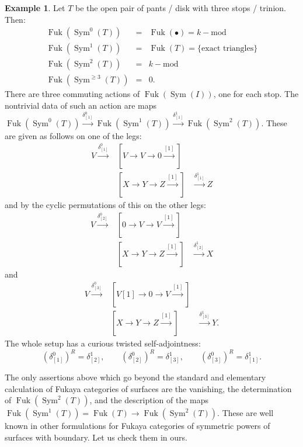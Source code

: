 \documentclass{article}
\DeclareMathOperator{\Sym}{Sym}
\DeclareMathOperator{\Fuk}{Fuk}
\theoremstyle{definition}
\newtheorem{example}[theorem]{Example}
\begin{document}
\begin{example}
    Let $T$ be the open pair of pants / disk with three stops / trinion.  Then:    
    \begin{eqnarray*}
        \Fuk(\Sym^0(T)) & = & \Fuk(\bullet) = k-\mathrm{mod} \\
        \Fuk(\Sym^1(T)) & = & \Fuk(T) = \{\mbox{exact triangles}\} \\
         \Fuk(\Sym^2(T)) & = & k-\mathrm{mod} \\
        \Fuk(\Sym^{\ge 3}(T)) & = & 0.
    \end{eqnarray*}
    There are three commuting actions of $\Fuk(\Sym(I))$, one for each stop.  The nontrivial data of such an action are  maps 
    $\Fuk(\Sym^0(T)) \xrightarrow{\delta^0_{[1]}} \Fuk(\Sym^1(T))\xrightarrow{\delta^1_{[1]}} \Fuk(\Sym^2(T))$.  These are given as follows on one of the legs: 
    \begin{eqnarray*}
        V \xrightarrow{\delta^0_{[1]}} & [V \to V \to 0 \xrightarrow{[1]}] & \\ 
        & [X \to Y \to Z \xrightarrow{[1]}] & \xrightarrow{\delta^1_{[1]}}  Z
    \end{eqnarray*}
    and by the cyclic permutations of this on the other legs:
        \begin{eqnarray*}
        V \xrightarrow{\delta^0_{[2]}} & [0 \to V \to V \xrightarrow{[1]}] & \\ 
        & [X \to Y \to Z \xrightarrow{[1]}] & \xrightarrow{\delta^1_{[2]}}  X
    \end{eqnarray*}
    and
        \begin{eqnarray*}
        V \xrightarrow{\delta^0_{[3]}} & [V[1] \to 0 \to V \xrightarrow{[1]}] & \\ 
        & [X \to Y \to Z \xrightarrow{[1]}] & \xrightarrow{\delta^1_{[3]}}  Y.
    \end{eqnarray*}
    The whole setup has a curious twisted self-adjointness:     \begin{equation}\label{werd} (\delta_{[1]}^0)^R = \delta_{[2]}^1, \qquad (\delta_{[2]}^0)^R = \delta_{[3]}^1, \qquad (\delta_{[3]}^0)^R = \delta_{[1]}^1.
    \end{equation}
\end{example}


The only assertions above which go beyond the standard and elementary calculation of Fukaya categories of surfaces are the vanishing, the determination of $\Fuk(\Sym^2(T))$, and the description of the maps $\Fuk(\Sym^1(T)) = \Fuk(T) \to \Fuk(\Sym^2(T))$.   These are well known in other formulations for Fukaya categories of symmetric powers of surfaces with boundary.
Let us check them in ours. 
\end{document}
